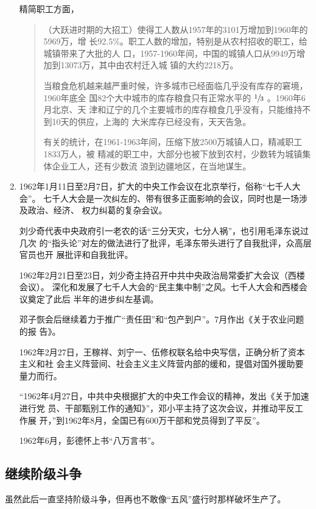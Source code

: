 \begin{enumerate}
  精简职工方面，
  \begin{quotation}
    （大跃进时期的大招工）使得工人数从1957年的3101万增加到1960年的5969万，增
    长92.5\%。职工人数的增加，特别是从农村招收的职工，给城镇带来了大批的人
    口，1957-1960年间，中国的城镇人口从9949万增加到13073万，其中由农村迁入城
    镇的大约2218万。

    当粮食危机越来越严重时候，许多城市已经面临几乎没有库存的窘境，1960年底全
    国82个大中城市的库存粮食只有正常水平的 $\sfrac{1}{3}$ 。1960年6月北京、天
    津和辽宁的几个主要城市的库存粮食几乎没有，只能维持不到10天的供应，上海的
    大米库存已经没有，天天告急。

    有关的统计，在1961-1963年间，压缩下放2500万城镇人口，精减职工1833万人，被
    精减的职工中，大部分也被下放到农村，少数转为城镇集体企业工人，还有少数流
    浪到边疆地区，在当地谋生。\cite{jingjianzhigong}
  \end{quotation}

\item 1962年1月11日至2月7日，扩大的中央工作会议在北京举行，俗称“七千人大会”。
  七千人大会是一次纠左的、带有很多正面影响的会议，同时也是一场涉及政治、经济、
  权力纠葛的复杂会议。

  刘少奇代表中央政府引一老农的话“三分天灾，七分人祸”，也引用毛泽东说过几次
  的“指头论”对左的做法进行了批评，毛泽东带头进行了自我批评，众高层官员也开
  展批评和自我批评。

  1962年2月21日至23日，刘少奇主持召开中共中央政治局常委扩大会议（西楼会议）。
  深化和发展了七千人大会的“民主集中制”之风。七千人大会和西楼会议奠定了此后
  半年的进步纠左基调。

  邓子恢会后继续着力于推广“责任田”和“包产到户”。7月作出《关于农业问题的报
  告》。

  1962年2月27日，王稼祥、刘宁一、伍修权联名给中央写信，正确分析了资本主义和社
  会主义阵营间、社会主义主义阵营内部的缓和，提倡对国外援助要量力而行。

  “1962年4月27日，中共中央根据扩大的中央工作会议的精神，发出《关于加速进行党
  员、干部甄别工作的通知》”，邓小平主持了这次会议，并推动平反工作展
  开，”到1962年8月，全国已有600万干部和党员得到了平反”。

  1962年6月，彭德怀上书“八万言书”。
\end{enumerate}

\subsection{继续阶级斗争}

虽然此后一直坚持阶级斗争，但再也不敢像“五风”盛行时那样破坏生产了。

